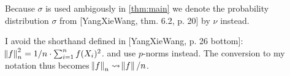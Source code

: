 
Because $\sigma$ is used ambigously in \cref{thm:main}
we denote the probability distribution $\sigma$
from [YangXieWang, thm. 6.2, p. 20] by $\nu$ instead.

I avoid the shorthand defined in
[YangXieWang, p. 26 bottom]:
$\norm{f}_n^2 = 1/n \cdot \sum_{i=1}^n f(X_i)^2$.
and use $p$-norms instead.
The conversion to my notation thus becomes
$\norm{f}_n \leadsto \norm{f}/n$.
